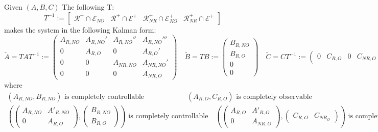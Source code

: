 \documentclass[english]{lectures}
\begin{document}
\begin{theorem}
    Given $(A,B,C)$ The following T:
    \[
        T^{-1}:=\begin{bmatrix}
            \mathcal{R}^+ \cap \mathcal{E}_{NO} & \mathcal{R}^+ \cap \mathcal{E}^+ & \mathcal{R}^+_{NR} \cap \mathcal{E}^+_{NO} & \mathcal{R}^+_{NR} \cap \mathcal{E}^+ 
        \end{bmatrix}
    \]
    makes the system in the following Kalman form:
    \[
        \tilde{A} = TAT^{-1} := \begin{pmatrix}
            A_{R,NO} & A_{R,NO}' & A_{R,NO}'' & A_{R,NO}'''\\
            0 & A_{R,O} & 0 & A_{R,O}'\\
            0 & 0 & A_{NR,NO} & A_{NR,NO}'\\
            0 & 0 & 0 & A_{NR,O}
        \end{pmatrix} \quad \tilde{B}=TB:= \begin{pmatrix}
            B_{R,NO}\\B_{R,O}\\0\\0
        \end{pmatrix} \quad \tilde{C} = CT^{-1}:=\begin{pmatrix}
            0 & C_{R,O} & 0 & C_{NR,O}
        \end{pmatrix}
    \]
    where
    \begin{gather*}
        (A_{R,NO},B_{R,NO}) \text{ is completely controllable} \qquad \qquad \qquad (A_{R,O},C_{R,O}) \text{ is completely observable}\\
        \left( \begin{pmatrix}
            A_{R,NO} & A'_{R,NO}\\
            0 & A_{R,O}
        \end{pmatrix}, \begin{pmatrix}
            B_{R,NO}\\B_{R,O}
        \end{pmatrix} \right) \text{ is completely controllable} \quad \left( 
            \begin{pmatrix}
                A_{R,O} & A'_{R,O}\\
                0 & A_{NR,O}
            \end{pmatrix},\begin{pmatrix}
                C_{R,O} & C_{NR_O}
            \end{pmatrix}\right) \text{ is completely observable}
    \end{gather*}
\end{theorem}
\end{document}
